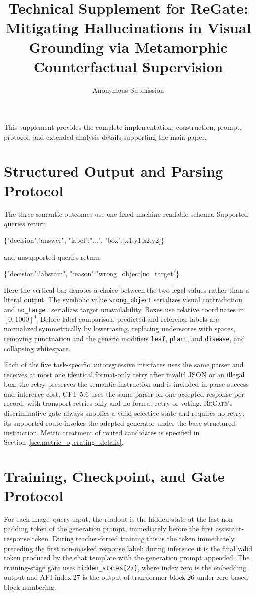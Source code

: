 \documentclass[letterpaper]{article}
\title{Technical Supplement for ReGate: Mitigating Hallucinations in Visual Grounding via Metamorphic Counterfactual Supervision}
\author{Anonymous Submission}
\newcommand{\Method}{\textsc{ReGate}\xspace}
\begin{document}
\maketitle

This supplement provides the complete implementation, construction, prompt, protocol, and extended-analysis details supporting the main paper.
\appendix

\section{Structured Output and Parsing Protocol}
\label{sec:structured_output}
The three semantic outcomes use one fixed machine-readable schema. Supported queries return
{\ttfamily\small\sloppy\noindent
\{"decision":"answer", "label":"...", "box":[x1,y1,x2,y2]\}
\par}
and unsupported queries return
{\ttfamily\small\sloppy\noindent
\{"decision":"abstain", "reason":"wrong\_object|no\_target"\}
\par}
Here the vertical bar denotes a choice between the two legal values rather than a literal output. The symbolic value \texttt{wrong\_object} serializes visual contradiction and \texttt{no\_target} serializes target unavailability. Boxes use relative coordinates in $[0,1000]^4$. Before label comparison, predicted and reference labels are normalized symmetrically by lowercasing, replacing underscores with spaces, removing punctuation and the generic modifiers \texttt{leaf}, \texttt{plant}, and \texttt{disease}, and collapsing whitespace.

Each of the five task-specific autoregressive interfaces uses the same parser and receives at most one identical format-only retry after invalid JSON or an illegal box; the retry preserves the semantic instruction and is included in parse success and inference cost. GPT-5.6 uses the same parser on one accepted response per record, with transport retries only and no format retry or voting. \Method's discriminative gate always supplies a valid selective state and requires no retry; its supported route invokes the adapted generator under the base structured instruction. Metric treatment of routed candidates is specified in Section~\ref{sec:metric_operating_details}.

\section{Training, Checkpoint, and Gate Protocol}
\label{sec:two_stage_protocol}
For each image--query input, the readout is the hidden state at the last non-padding token of the generation prompt, immediately before the first assistant-response token. During teacher-forced training this is the token immediately preceding the first non-masked response label; during inference it is the final valid token produced by the chat template with the generation prompt appended. The training-stage gate uses \texttt{hidden\_states[27]}, where index zero is the embedding output and API index 27 is the output of transformer block 26 under zero-based block numbering.
\end{document}
